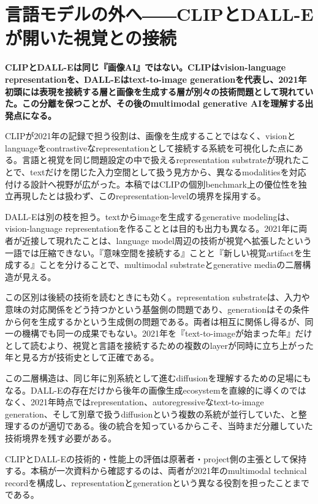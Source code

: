 \section{言語モデルの外へ――CLIPとDALL-Eが開いた視覚との接続}
\noindent\textbf{CLIPとDALL-Eは同じ『画像AI』ではない。CLIPはvision-language representationを、DALL-Eはtext-to-image generationを代表し、2021年初頭には表現を接続する層と画像を生成する層が別々の技術問題として現れていた。この分離を保つことが、その後のmultimodal generative AIを理解する出発点になる。}\autocite{src-005ad180fc46,src-009747d6fa68,src-bc37d5969edc,src-f14c51ae873c}

CLIPが2021年の記録で担う役割は、画像を生成することではなく、visionとlanguageをcontrastiveなrepresentationとして接続する系統を可視化した点にある。言語と視覚を同じ問題設定の中で扱えるrepresentation substrateが現れたことで、textだけを閉じた入力空間として扱う見方から、異なるmodalitiesを対応付ける設計へ視野が広がった。本稿ではCLIPの個別benchmark上の優位性を独立再現したとは扱わず、このrepresentation-levelの境界を採用する。\autocite{src-005ad180fc46,src-bc37d5969edc}


DALL-Eは別の枝を担う。textからimageを生成するgenerative modelingは、vision-language representationを作ることとは目的も出力も異なる。2021年に両者が近接して現れたことは、language model周辺の技術が視覚へ拡張したという一語では圧縮できない。『意味空間を接続する』ことと『新しい視覚artifactを生成する』ことを分けることで、multimodal substrateとgenerative mediaの二層構造が見える。\autocite{src-009747d6fa68,src-f14c51ae873c}


この区別は後続の技術を読むときにも効く。representation substrateは、入力や意味の対応関係をどう持つかという基盤側の問題であり、generationはその条件から何を生成するかという生成側の問題である。両者は相互に関係し得るが、同一の機構でも同一の成果でもない。2021年を『text-to-imageが始まった年』だけとして読むより、視覚と言語を接続するための複数のlayerが同時に立ち上がった年と見る方が技術史として正確である。\autocite{src-005ad180fc46,src-009747d6fa68,src-bc37d5969edc,src-f14c51ae873c}


この二層構造は、同じ年に別系統として進むdiffusionを理解するための足場にもなる。DALL-Eの存在だけから後年の画像生成ecosystemを直線的に導くのではなく、2021年時点ではrepresentation、autoregressiveなtext-to-image generation、そして別章で扱うdiffusionという複数の系統が並行していた、と整理するのが適切である。後の統合を知っているからこそ、当時まだ分離していた技術境界を残す必要がある。\autocite{src-005ad180fc46,src-009747d6fa68,src-bc37d5969edc,src-f14c51ae873c}


\begin{claimboundary}
CLIPとDALL-Eの技術的・性能上の評価は原著者・project側の主張として保持する。本稿が一次資料から確認するのは、両者が2021年のmultimodal technical recordを構成し、representationとgenerationという異なる役割を担ったことまでである。\autocite{src-005ad180fc46,src-009747d6fa68,src-bc37d5969edc,src-f14c51ae873c}
\end{claimboundary}
